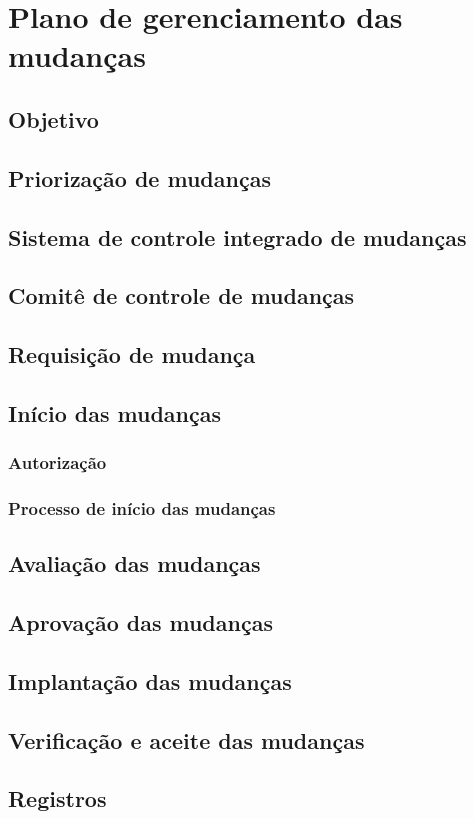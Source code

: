 \chapter{Plano de gerenciamento das mudanças} %
\label{ch:change-management-plan}

\section{Objetivo}

\section{Priorização de mudanças}

\section{Sistema de controle integrado de mudanças}

\section{Comitê de controle de mudanças}

\section{Requisição de mudança}

\section{Início das mudanças}

\subsection{Autorização}

\subsection{Processo de início das mudanças}

\section{Avaliação das mudanças}

\section{Aprovação das mudanças}

\section{Implantação das mudanças}

\section{Verificação e aceite das mudanças}

\section{Registros}